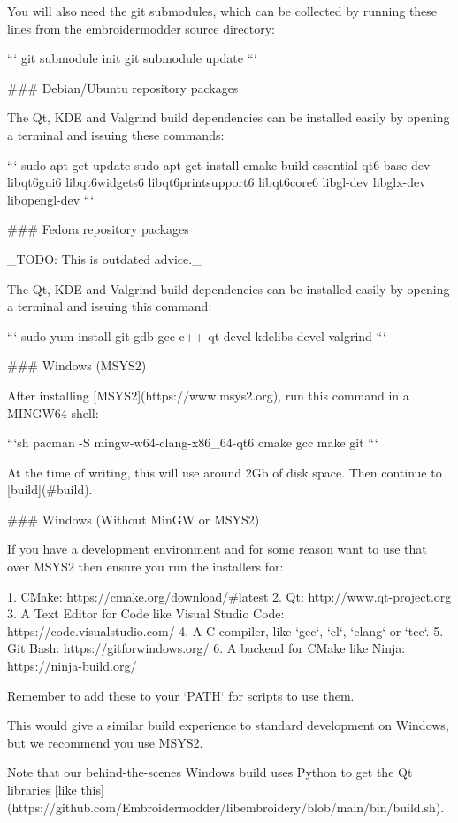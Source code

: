 You will also need the git submodules, which can be collected by running these lines
from the embroidermodder source directory:

```
git submodule init
git submodule update
```

### Debian/Ubuntu repository packages

The Qt, KDE and Valgrind build dependencies can be installed easily by
opening a terminal and issuing these commands:

```
sudo apt-get update
sudo apt-get install cmake build-essential qt6-base-dev libqt6gui6 libqt6widgets6 libqt6printsupport6 libqt6core6 libgl-dev libglx-dev libopengl-dev
```

### Fedora repository packages

_TODO: This is outdated advice._

The Qt, KDE and Valgrind build dependencies can be installed easily
by opening a terminal and issuing this command:

```
sudo yum install git gdb gcc-c++ qt-devel kdelibs-devel valgrind
```

### Windows (MSYS2)

After installing [MSYS2](https://www.msys2.org), run this command in a MINGW64 shell:

```sh
pacman -S mingw-w64-clang-x86_64-qt6 cmake gcc make git
```

At the time of writing, this will use around 2Gb of disk space. Then continue to [build](#build).

### Windows (Without MinGW or MSYS2)

If you have a development environment and for some reason want to use that over MSYS2 then ensure you run the installers for:

1. CMake: https://cmake.org/download/#latest
2. Qt: http://www.qt-project.org
3. A Text Editor for Code like Visual Studio Code: https://code.visualstudio.com/
4. A C compiler, like `gcc`, `cl`, `clang` or `tcc`.
5. Git Bash: https://gitforwindows.org/
6. A backend for CMake like Ninja: https://ninja-build.org/

Remember to add these to your `PATH` for scripts to use them.

This would give a similar build experience to standard development on Windows, but we recommend you use MSYS2.

Note that our behind-the-scenes Windows build uses Python to get the Qt libraries
[like this](https://github.com/Embroidermodder/libembroidery/blob/main/bin/build.sh).


